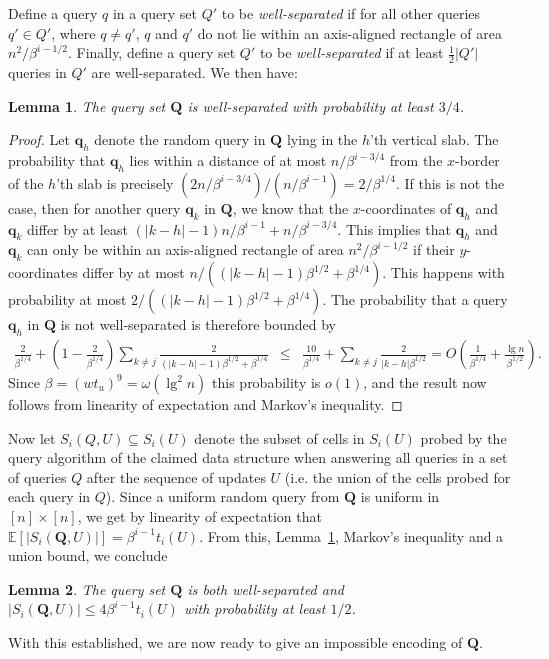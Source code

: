 \documentclass[letterpaper]{article}
\newtheorem{lemma}{Lemma}
\newcommand{\E}{\mathbb{E}}
\newcommand{\Q}{\textbf{Q}}
\newcommand{\q}{\textbf{q}}
\begin{document}
Define a query $q$ in a query set $Q'$ to be \emph{well-separated} if
for all other queries $q' \in Q'$, where $q \neq q'$, $q$ and $q'$ do
not lie within an axis-aligned rectangle of area
$n^2/\beta^{i-1/2}$. Finally, define a query set $Q'$ to be
\emph{well-separated} if at least $\tfrac{1}{2}|Q'|$ queries in $Q'$ are
well-separated. We then have:
\begin{lemma}
\label{lem:qsize}
The query set $\Q$ is well-separated with probability at least $3/4$.
\end{lemma}
\begin{proof}
Let $\q_h$ denote the random query in $\Q$ lying in the $h$'th
vertical slab. The probability that $\q_h$ lies within a distance of at most  $n/\beta^{i-3/4}$ from the $x$-border of 
the $h$'th slab is precisely $(2n/\beta^{i-3/4}) / (n/\beta^{i-1}) =
2/\beta^{1/4}$. If this is not the case, then for another query $\q_k$
in $\Q$, we know that the $x$-coordinates of $\q_h$ and $\q_k$ differ
by at least $(|k-h|-1)n/\beta^{i-1}+n/\beta^{i-3/4}$. This implies
that $\q_h$ and $\q_k$ can only be within an axis-aligned rectangle of
area $n^2/\beta^{i-1/2}$ if their $y$-coordinates differ by at most
$n/((|k-h|-1)\beta^{1/2}+\beta^{1/4})$. This happens with probability
at most $2/((|k-h|-1)\beta^{1/2}+\beta^{1/4})$. The probability that a
query $\q_h$ in $\Q$ is not well-separated is therefore bounded by
\begin{eqnarray*}
\frac{2}{\beta^{1/4}}+(1-\frac{2}{\beta^{1/4}})\sum_{k \neq j}
\frac{2}{(|k-h|-1)\beta^{1/2}+\beta^{1/4}}
&\leq& \frac{10}{\beta^{1/4}}+\sum_{k \neq
  j} \frac{2}{|k-h|\beta^{1/2}}=O\left(\frac{1}{\beta^{1/4}}+\frac{\lg n}{\beta^{1/2}}\right).
\end{eqnarray*}
Since $\beta=(wt_u)^9=\omega(\lg^2 n)$ this probability is $o(1)$,
and the result now follows from linearity of expectation
and Markov's inequality.
\end{proof}

Now let $S_i(Q,U) \subseteq S_i(U)$ denote the subset of cells in
$S_i(U)$ probed by the query algorithm of the claimed data structure
when answering all queries in a set of queries $Q$ after the sequence
of updates $U$ (i.e. the union of the cells probed for each query in
$Q$). Since a uniform random query from $\Q$ is uniform in $[n] \times
[n]$, we get by linearity of expectation that $\E[|S_i(\Q,U)|]=\beta^{i-1}t_i(U)$. From this, Lemma~\ref{lem:qsize}, Markov's
inequality and a union bound, we conclude
\begin{lemma}
\label{lem:well}
The query set $\Q$ is both well-separated and $|S_i(\Q,U)| \leq 4
\beta^{i-1} t_i(U)$ with probability at least $1/2$.
\end{lemma}
With this established, we are now ready to give an impossible
encoding of  $\Q$.
\end{document}
